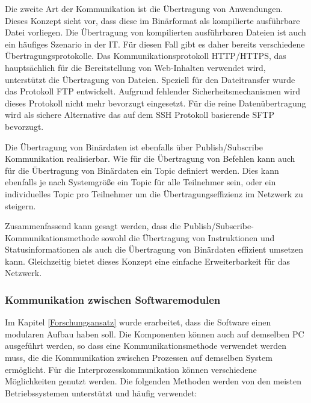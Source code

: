 Die zweite Art der Kommunikation ist die Übertragung von Anwendungen. Dieses Konzept sieht vor, dass diese im Binärformat als kompilierte ausführbare Datei vorliegen. Die Übertragung von kompilierten ausführbaren Dateien ist auch ein häufiges Szenario in der \gls{IT}. Für diesen Fall gibt es daher bereits verschiedene Übertragungsprotokolle. Das Kommunikationsprotokoll \gls{HTTP}/\gls{HTTPS}, das hauptsächlich für die Bereitstellung von Web-Inhalten verwendet wird, unterstützt die Übertragung von Dateien. Speziell für den Dateitransfer wurde das Protokoll \gls{FTP} entwickelt. Aufgrund fehlender Sicherheitsmechanismen wird dieses Protokoll nicht mehr bevorzugt eingesetzt. Für die reine Datenübertragung wird als sichere Alternative das auf dem \gls{SSH} Protokoll basierende \gls{SFTP} bevorzugt.

Die Übertragung von Binärdaten ist ebenfalls über Publish/Subscribe Kommunikation realisierbar. Wie für die Übertragung von Befehlen kann auch für die Übertragung von Binärdaten ein Topic definiert werden. Dies kann ebenfalls je nach Systemgröße ein Topic für alle Teilnehmer sein, oder ein individuelles Topic pro Teilnehmer um die Übertragungseffizienz im Netzwerk zu steigern. 

Zusammenfassend kann gesagt werden, dass die Publish/Subscribe-Kommunikationsmethode sowohl die Übertragung von Instruktionen und Statusinformationen als auch die Übertragung von Binärdaten effizient umsetzen kann. Gleichzeitig bietet dieses Konzept eine einfache Erweiterbarkeit für das Netzwerk.

\subsubsection{Kommunikation zwischen Softwaremodulen}
\label{Kommunikation zwischen Softwaremodulen}

Im Kapitel \autoref{Forschungsansatz} wurde erarbeitet, dass die Software einen modularen Aufbau haben soll. Die Komponenten können auch auf demselben PC ausgeführt werden, so dass eine Kommunikationsmethode verwendet werden muss, die die Kommunikation zwischen Prozessen auf demselben System ermöglicht. Für die Interprozesskommunikation können verschiedene Möglichkeiten genutzt werden. Die folgenden Methoden werden von den meisten Betriebssystemen unterstützt und häufig verwendet:

